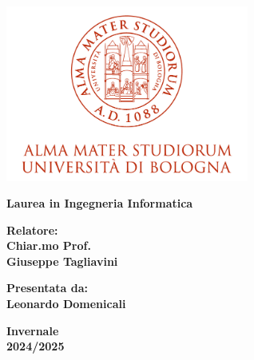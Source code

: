 \begin{titlepage}
\begin{center}
\begin{center}
  \includegraphics[width=0.6\textwidth]{Figures/UniboLogo.png}
\end{center}
\vspace{4em}
{\small{\bf Laurea in Ingegneria Informatica }}
\end{center}
\vspace{15mm}

\vspace{30mm}
\par
\noindent
\begin{minipage}[t]{0.47\textwidth}
{\large{\bf Relatore:\\
Chiar.mo Prof.\\
Giuseppe Tagliavini}}
\end{minipage}
\hfill
\begin{minipage}[t]{0.47\textwidth}\raggedleft
{\large{\bf Presentata da:\\
Leonardo Domenicali}}
\end{minipage}
\vspace{20mm}
\begin{center}
{\large{\bf Invernale\\%
2024/2025 }}%
\end{center}
\end{titlepage}